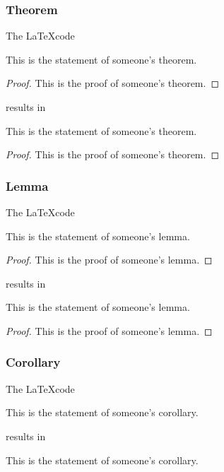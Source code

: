 \documentclass[report,english]{enacom}
\begin{document}
\subsubsection{Theorem}
	The \LaTeX code
    \begin{lcode}
    \begin{theorem}[someone]
    	This is the statement of someone's theorem.
    \end{theorem}
    \begin{proof}
    	This is the proof of someone's theorem.
    \end{proof}
    \end{lcode}
    results in
    \begin{theorem}[someone]
    	This is the statement of someone's theorem.
    \end{theorem}
    \begin{proof}
    	This is the proof of someone's theorem.
    \end{proof}

\subsubsection{Lemma}
	The \LaTeX code
    \begin{lcode}
    \begin{lemma}[someone]
    	This is the statement of someone's lemma.
    \end{lemma}
    \begin{proof}
    	This is the proof of someone's lemma.
    \end{proof}
    \end{lcode}
    results in
    \begin{lemma}[someone]
    	This is the statement of someone's lemma.
    \end{lemma}
    \begin{proof}
    	This is the proof of someone's lemma.
    \end{proof}

\subsubsection{Corollary}
	The \LaTeX code
	\begin{lcode}
	\begin{corollary}[someone]
		This is the statement of someone's corollary.
	\end{corollary}
	\end{lcode}
	results in
	\begin{corollary}[someone]
	This is the statement of someone's corollary.
	\end{corollary}
\end{document}
